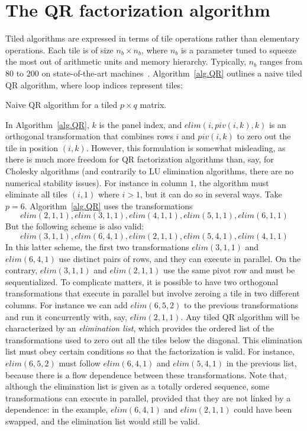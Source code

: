 \documentclass[a4paper,twopages]{article}
\newcommand{\elim}{\mathit{elim}}
\begin{document}
\section{The QR factorization algorithm}
\label{sec.QR}

Tiled algorithms are expressed in terms of tile operations rather than
elementary operations.  Each tile is of size $n_b \times n_b$, where $n_b$ is a
parameter tuned to squeeze the most out of arithmetic units and memory
hierarchy. Typically, $n_b$ ranges from $80$ to $200$ on state-of-the-art
machines~\cite{sc09-agullo}. Algorithm~\ref{alg.QR} outlines a naive tiled QR
algorithm, where loop indices represent tiles:

\begin{algorithm}[htbp]
  \DontPrintSemicolon
  \For{$\textnormal{k} = 1$ to $\min(p,q)$}{
     \For{$\textnormal{i} = k+1$ to $p$}{
     $\elim(i, piv(i,k), k)$\;
    }
  }
\caption{Naive QR algorithm for a tiled $p \times q$ matrix.}
\label{alg.QR}
\end{algorithm}

In Algorithm~\ref{alg.QR}, $k$ is the panel index, and $\elim(i, piv(i,k), k)$
is an orthogonal transformation that combines rows $i$ and $piv(i,k)$ to zero
out the tile in position $(i,k)$. However, this formulation is somewhat
misleading, as there is much more freedom for QR factorization algorithms than,
say, for Cholesky algorithms (and contrarily to LU elimination algorithms,
there are no numerical stability issues).  For instance in column $1$, the
algorithm must eliminate all tiles $(i,1)$ where $i>1$, but it can do so in
several ways. Take $p=6$. Algorithm~\ref{alg.QR} uses the transformations
\[\elim(2, 1, 1), \elim(3, 1, 1), \elim(4, 1, 1), \elim(5, 1, 1), \elim(6, 1, 1)\]
But the following scheme is also valid:
\[\elim(3, 1, 1), \elim(6, 4, 1), \elim(2, 1, 1), \elim(5, 4, 1), \elim(4, 1, 1)\]
In this latter scheme, the first two transformations  $\elim(3, 1, 1)$ and $\elim(6, 4, 1)$
use distinct pairs of rows, and they can execute in parallel. On the contrary, $\elim(3, 1, 1)$ and
$\elim(2, 1, 1)$ use the same pivot row and must be sequentialized.
To complicate matters, it is possible to have two orthogonal transformations that execute in parallel
but involve zeroing a tile in two different columns. For instance we can add $\elim(6, 5, 2)$
to the previous transformations and run it concurrently with, say, $\elim(2, 1, 1)$.
Any tiled QR algorithm will be characterized by an \emph{elimination list}, which provides
the ordered list of the transformations used to zero out all the tiles below the diagonal.
This elimination list must obey certain conditions so that the factorization is valid.
For instance, $\elim(6, 5, 2)$ must follow $\elim(6, 4, 1)$ and $\elim(5, 4, 1)$
in the previous list, because there is a flow dependence between these transformations.
Note that, although the elimination list is given as a totally ordered sequence, some transformations can execute
in parallel, provided that they are not linked by a dependence: in the example,
$\elim(6, 4, 1)$ and $\elim(2, 1, 1)$  could have been swapped, and the elimination list
would still be valid.
\end{document}

